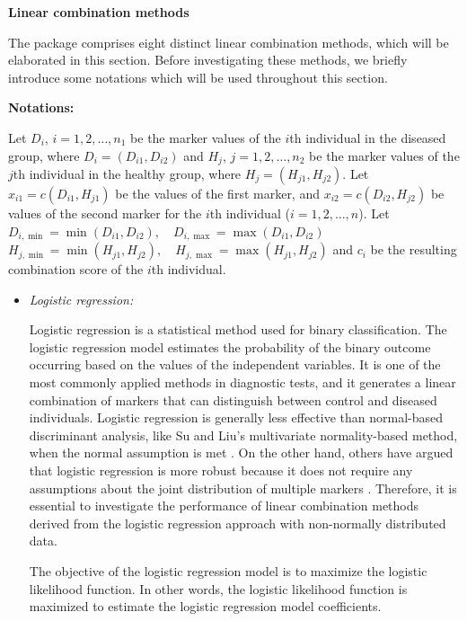 \textbf{Linear combination methods}

The  package comprises eight distinct linear combination methods, which will be elaborated in this section. Before investigating these methods, we briefly introduce some notations which will be used throughout this section.

\textbf{Notations:}

Let \(D_i\), \(i = 1, 2, \ldots, n_1\) be the marker values of the \(i\)th individual in the diseased group, where \(D_i = (D_{i1}, D_{i2})\) and \(H_j\), \(j = 1, 2, \ldots, n_2\) be the marker values of the \(j\)th individual in the healthy group, where \(H_j = (H_{j1}, H_{j2})\). Let \(x_{i1} = c(D_{i1}, H_{j1})\) be the values of the first marker, and \(x_{i2} = c(D_{i2}, H_{j2})\) be values of the second marker for the \(i\)th individual (\(i = 1, 2, \ldots, n\)). Let \(D_{i,\min} = \min(D_{i1}, D_{i2}), \quad D_{i,\max} = \max(D_{i1}, D_{i2})\) \(H_{j,\min} = \min(H_{j1}, H_{j2}), \quad H_{j,\max} = \max(H_{j1}, H_{j2})\) and \(c_i\) be the resulting combination score of the \(i\)th individual.

\begin{itemize}
\item
  \emph{Logistic regression:}

  Logistic regression is a statistical method used for binary classification. The logistic regression model estimates the probability of the binary outcome occurring based on the values of the independent variables. It is one of the most commonly applied methods in diagnostic tests, and it generates a linear combination of markers that can distinguish between control and diseased individuals. Logistic regression is generally less effective than normal-based discriminant analysis, like Su and Liu's multivariate normality-based method, when the normal assumption is met \citep{ruiz1991asymptotic, efron1975efficiency}. On the other hand, others have argued that logistic regression is more robust because it does not require any assumptions about the joint distribution of multiple markers \citep{cox1989analysis}. Therefore, it is essential to investigate the performance of linear combination methods derived from the logistic regression approach with non-normally distributed data.

  The objective of the logistic regression model is to maximize the logistic likelihood function. In other words, the logistic likelihood function is maximized to estimate the logistic regression model coefficients.
\end{itemize}

